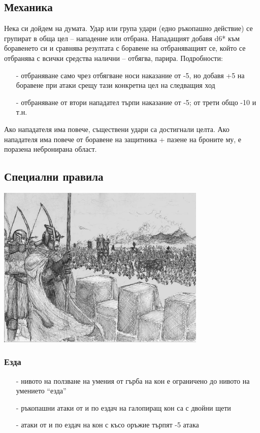 \subsection{Механика}
Нека си дойдем на думата.
Удар или група удари (едно ръкопашно действие) се групират в обща цел – нападение или отбрана.
Нападащият добавя d6* към боравенето си и сравнява резултата с боравене на отбраняващият се, който се отбранява с всички средства налични – отбягва, парира.
Подробности:
\begin{itemize}
\item[-]{отбраняване само чрез отбягване носи наказание от -5, но добавя +5 на боравене при атаки срещу тази конкретна цел на следващия ход}
\item[-]{отбраняване от втори нападател търпи наказание от -5; от трети общо -10 и т.н.}
\end{itemize}

Ако нападателя има повече, съществени удари са достигнали целта.
Ако нападателя има повече от боравене на защитника + пазене на броните му, е поразена небронирана област.

\subsection{Специални правила}
\begin{center}
\includegraphics[width=0.75\textwidth]{../images/siege}~
\\[1cm]
\end{center}

\subsubsection{Езда}
\begin{itemize}
\item[-]{нивото на ползване на умения от гърба на кон е ограничено до нивото на умението “езда”}
\item[-]{ръкопашни атаки от и по ездач на галопиращ кон са с двойни щети}
\item[-]{атаки от и по ездач на кон с късо оръжие търпят -5 атака}
\end{itemize}

